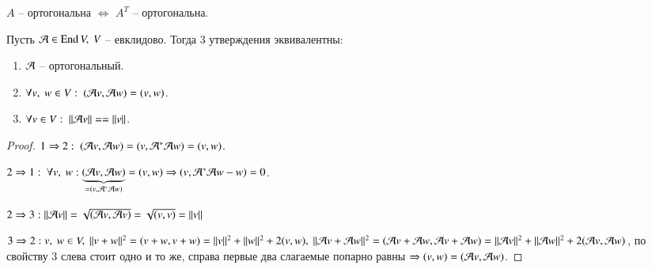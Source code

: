 \documentclass[main]{subfiles}
\begin{document}
\begin{remark}
    $A$ -- ортогональна $\Leftrightarrow$ $A^T$ -- ортогональна.
\end{remark}

\begin{proposition}
    Пусть $\mathcal{A} \in \operatorname{End} V, \ V$ -- евклидово. Тогда 3 утверждения эквивалентны:
    \begin{enumerate}
        \item $\mathcal{A}$ -- ортогональный.
        \item $\forall v, \ w \in V: \ (\mathcal{A} v, \mathcal{A} w) = (v, w)$.
        \item $\forall v \in V: \ ||\mathcal{A} v|| == ||v||$.
    \end{enumerate}
\end{proposition}

\begin{proof}
    $1 \Rightarrow 2: \ (\mathcal{A} v, \mathcal{A} w) = (v, \mathcal{A}^* \mathcal{A} w) = (v, w)$.

    $2 \Rightarrow 1: \ \forall v, \ w: \underbrace{(\mathcal{A} v, \mathcal{A} w)}_{= (v, \mathcal{A}^* \mathcal{A} w)} = (v, w) \Rightarrow (v, \mathcal{A}^* \mathcal{A} w - w) = 0$.

    $2 \Rightarrow 3: ||\mathcal{A} v|| = \sqrt{(\mathcal{A} v, \mathcal{A} v)} = \sqrt{(v, v)} = ||v||$

    $3 \Rightarrow 2: v, \ w \in V, \ ||v + w||^2 = (v+w, v+w) = ||v||^2 + ||w||^2 + 2(v, w), \
        ||\mathcal{A} v + \mathcal{A} w||^2 = (\mathcal{A} v + \mathcal{A} w, \mathcal{A} v + \mathcal{A} w) = ||\mathcal{A} v||^2 + ||\mathcal{A} w||^2 + 2(\mathcal{A} v, \mathcal{A} w)$,
    по свойству 3 слева стоит одно и то же, справа первые два слагаемые попарно равны $\Rightarrow (v, w) = (\mathcal{A} v, \mathcal{A} w)$.
\end{proof}
\end{document}
